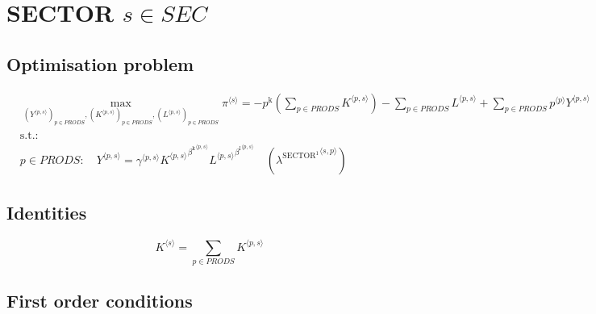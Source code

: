 \section{SECTOR $s\in {S\!E\!C}$}

\subsection{Optimisation problem}

\begin{align}
&\max_{\left({Y}^{\langle p,s\rangle}\right)_{p\in {P\!R\!O\!D\!S}}, \left({K}^{\langle p,s\rangle}\right)_{p\in {P\!R\!O\!D\!S}}, \left({L}^{\langle p,s\rangle}\right)_{p\in {P\!R\!O\!D\!S}}
} {\pi}^{\langle s\rangle} = -{p^{\mathrm{k}}} \left(\sum_{p\in {P\!R\!O\!D\!S}} {K}^{\langle p,s\rangle}\right) - \sum_{p\in {P\!R\!O\!D\!S}} {L}^{\langle p,s\rangle} + \sum_{p\in {P\!R\!O\!D\!S}} {{p}^{\langle p\rangle}} {{Y}^{\langle p,s\rangle}}\\
&\mathrm{s.t.:}\nonumber\\
& p\in {P\!R\!O\!D\!S}\colon\quad {Y}^{\langle p,s\rangle} = {{\gamma}^{\langle p,s\rangle}} {{{K}^{\langle p,s\rangle}}^{{\beta^{\mathrm{k}}}^{\langle p,s\rangle}}} {{{L}^{\langle p,s\rangle}}^{{\beta^{\mathrm{l}}}^{\langle p,s\rangle}}} \quad \left({\lambda^{\mathrm{SECTOR}^{\mathrm{1}}}}^{\langle s,p\rangle}\right)
\end{align}


\subsection{Identities}

\begin{equation}
{K}^{\langle s\rangle} = \sum_{p\in {P\!R\!O\!D\!S}} {K}^{\langle p,s\rangle}
\end{equation}


\subsection{First order conditions}

